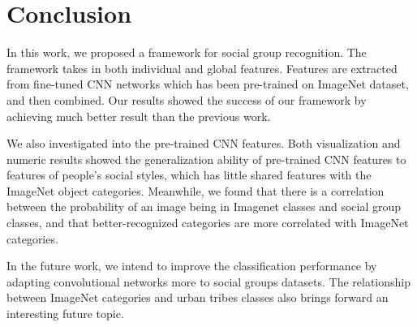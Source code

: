 \documentclass[10pt,twocolumn,letterpaper]{article}
\begin{document}
\section{Conclusion}
In this work, we proposed a framework for social group recognition. The framework takes in both individual and global features. Features are extracted from fine-tuned CNN networks which has been pre-trained on ImageNet dataset, and then combined. Our results showed the success of our framework by achieving much better result than the previous work. 

We also investigated into the pre-trained CNN features. Both visualization and numeric results showed the generalization ability of pre-trained CNN features to features of people's social styles, which has little shared features with the ImageNet object categories. Meanwhile, we found that there is a correlation between the probability of an image being in Imagenet classes and social group classes, and that better-recognized categories are more correlated with ImageNet categories. 

In the future work, we intend to improve the classification performance by adapting convolutional networks more to social groups datasets. The relationship between ImageNet categories and urban tribes classes also brings forward an interesting future topic.



{\small

%
%

}
\end{document}
